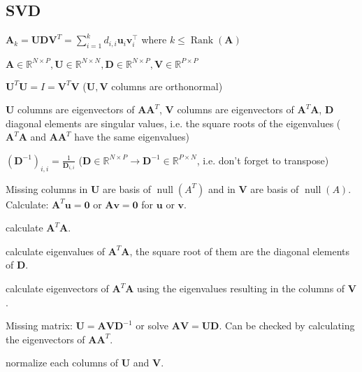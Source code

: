 \documentclass[a4paper, 11pt, landscape]{article}
\begin{document}
\begin{multicols*}{3}
\section{SVD}
\begin{compactitem}
	\item $\mathbf{A}_k = \mathbf{U} \mathbf{D} \mathbf{V}^T = \sum_{i=1}^{k} d_{i,i} \mathbf{u}_i \mathbf{v}_i^\top$ where $k \leq \operatorname{Rank}(\mathbf{A})$
	\item $\mathbf{A} \in \mathbb{R}^{N \times P}, \mathbf{U} \in \mathbb{R}^{N \times N}, \mathbf{D} \in \mathbb{R}^{N \times P}, \mathbf{V} \in \mathbb{R}^{P \times P}$
	\item $\mathbf{U}^T \mathbf{U} = I = \mathbf{V}^T \mathbf{V}$ ($\mathbf{U}, \mathbf{V}$ columns are orthonormal)
	\item $\mathbf{U}$ columns are eigenvectors of $\mathbf{A} \mathbf{A}^T$, $\mathbf{V}$ columns are eigenvectors of $\mathbf{A}^T \mathbf{A}$, $\mathbf{D}$ diagonal elements are singular values, i.e. the square roots of the eigenvalues ($\mathbf{A}^T \mathbf{A}$ and $\mathbf{A} \mathbf{A}^T$ have the same eigenvalues)
	\item $(\mathbf{D}^{-1})_{i,i} = \frac{1}{\mathbf{D}_{i, i}}$ ($\mathbf{D} \in \mathbb{R}^{N \times P} \to \mathbf{D}^{-1} \in \mathbb{R}^{P \times N}$, i.e. don't forget to transpose)
	\item Missing columns in $\mathbf{U}$ are basis of $\operatorname{null}(A^T)$ and in $\mathbf{V}$ are basis of $\operatorname{null}(A)$. Calculate: $\mathbf{A}^T \mathbf{u} = \mathbf{0}$ or $\mathbf{A} \mathbf{v} = \mathbf{0}$ for $\mathbf{u}$ or $\mathbf{v}$.
\end{compactitem}

\begin{compactenum}
	\item calculate $\mathbf{A}^T \mathbf{A}$.
	\item calculate eigenvalues of $\mathbf{A}^T \mathbf{A}$, the square root of them are the diagonal elements of $\mathbf{D}$.
	\item calculate eigenvectors of $\mathbf{A}^T \mathbf{A}$ using the eigenvalues resulting in the columns of $\mathbf{V}$.
	\item Missing matrix: $\mathbf{U} = \mathbf{A} \mathbf{V} \mathbf{D}^{-1}$ or solve $\mathbf{AV = UD}$. Can be checked by calculating the eigenvectors of $\mathbf{A} \mathbf{A}^T$.
	\item normalize each columns of $\mathbf{U}$ and $\mathbf{V}$.
\end{compactenum}


\end{multicols*}
\end{document}
